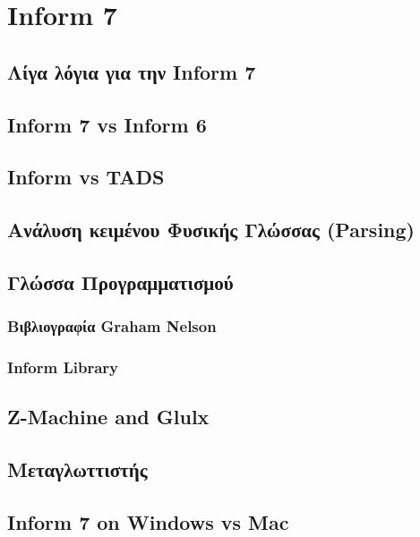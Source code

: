 \section{Inform 7}\label{sec:chapter3}

\subsection{Λίγα λόγια για την Inform 7}
\subsection{Inform 7 vs Inform 6}
\subsection{Inform vs TADS}
\subsection{Ανάλυση κειμένου Φυσικής Γλώσσας (Parsing)}
\subsection{Γλώσσα Προγραμματισμού}
\subsubsection{Βιβλιογραφία Graham Nelson}
\subsubsection{Inform Library}
\subsection{Z-Machine and Glulx}
\subsection{Μεταγλωττιστής}
\subsection{Inform 7 on Windows vs Mac}